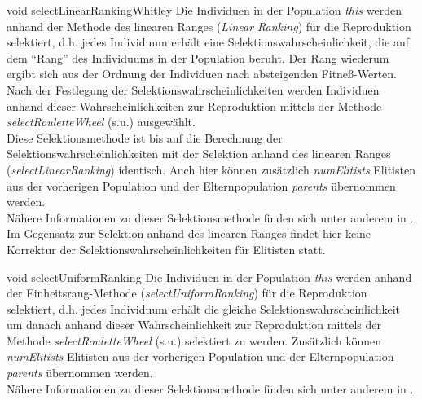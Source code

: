 \documentclass{report}
\begin{document}
\newpage

\setNormalInstance
\setCorrectWidthThree{8pt}
\printMethodWithParamsSaved
{void}
{}
{selectLinearRankingWhitley}
{Die Individuen in der Population {\em this} werden anhand der 
 Methode des linearen Ranges ({\em Linear Ranking}) f\"ur die
 Reproduktion selektiert, d.h. jedes Individuum erh\"alt
 eine Selektionswahrscheinlichkeit, die auf dem ``Rang'' des
 Individuums in der Population beruht. Der Rang wiederum ergibt
 sich aus der Ordnung der Individuen nach absteigenden
 Fitne{\ss}-Werten. Nach der Festlegung der Selektionswahrscheinlichkeiten
 werden Individuen anhand dieser Wahrscheinlichkeiten zur Reproduktion 
 mittels der Methode {\em selectRouletteWheel} (s.u.) ausgew\"ahlt.\\
 Diese Selektionsmethode ist bis auf die Berechnung der 
 Selektionswahrscheinlichkeiten mit der Selektion anhand des
 linearen Ranges ({\em selectLinearRanking}) identisch.
 Auch hier k\"onnen zus\"atzlich {\em numElitists} Elitisten
 aus der vorherigen Population und der Elternpopulation
 {\em parents} \"ubernommen werden.\\
 N\"ahere Informationen zu dieser Selektionsmethode finden sich
 unter anderem in \cite{Whitley}.}
{Im Gegensatz zur Selektion anhand des linearen Ranges findet
 hier keine Korrektur der Selektionswahrscheinlichkeiten f\"ur Elitisten
 statt.}
\setCorrectWidthThree{4pt}

\newpage

\setNormalInstance
\setCorrectWidthThree{8pt}
\printMethodWithParamsSaved
{void}
{}
{selectUniformRanking}
{Die Individuen in der Population {\em this} werden anhand der 
 Einheitsrang-Methode ({\em selectUniformRanking}) f\"ur die
 Reproduktion selektiert, d.h. jedes Individuum erh\"alt
 die gleiche Selektionswahrscheinlichkeit um danach 
 anhand dieser Wahrscheinlichkeit zur Reproduktion mittels der 
 Methode {\em selectRouletteWheel} (s.u.) selektiert zu werden.
 Zus\"atzlich k\"onnen {\em numElitists} Elitisten
 aus der vorherigen Population und der Elternpopulation
 {\em parents} \"ubernommen werden.\\
 N\"ahere Informationen zu dieser Selektionsmethode finden sich
 unter anderem in \cite{EALib}.}
{}
\setCorrectWidthThree{4pt}
\end{document}
